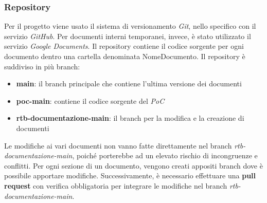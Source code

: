 \subsubsection{Repository}
    Per il progetto viene usato il sistema di versionamento \emph{Git}, nello specifico con 
    il servizio \emph{GitHub}. Per documenti interni temporanei, invece, è stato utilizzato il servizio 
    \emph{Google Documents}.
    Il repository contiene il codice sorgente per ogni documento dentro una cartella denominata
    NomeDocumento. Il repository è suddiviso in più branch:
    \begin{itemize}
        \item \textbf{main}: il branch principale che contiene l'ultima versione dei documenti
        \item \textbf{poc-main}: contiene il codice sorgente del \emph{PoC}
        \item \textbf{rtb-documentazione-main}: il branch per la modifica e la creazione di documenti
    \end{itemize}
    Le modifiche ai vari documenti non vanno fatte direttamente nel branch \emph{rtb-documentazione-main},
    poiché porterebbe ad un elevato rischio di incongruenze e conflitti. Per ogni sezione di un documento, vengono
    creati appositi branch dove è possibile apportare modifiche. Successivamente, è necessario 
    effettuare una \textbf{pull request} con verifica obbligatoria per integrare le modifiche nel branch 
    \emph{rtb-documentazione-main}.